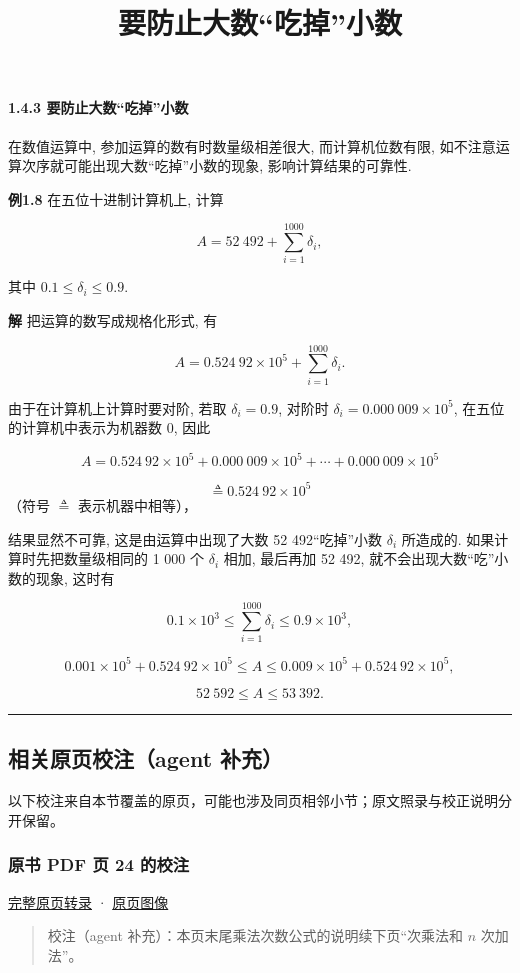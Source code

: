 \documentclass[
  10pt,
  fontset=fandol]{ctexart}
\title{要防止大数``吃掉''小数}
\author{}
\date{}
\begin{document}
\maketitle

\paragraph{1.4.3 要防止大数``吃掉''小数}\label{ux8981ux9632ux6b62ux5927ux6570ux5403ux6389ux5c0fux6570}

在数值运算中, 参加运算的数有时数量级相差很大, 而计算机位数有限, 如不注意运算次序就可能出现大数``吃掉''小数的现象, 影响计算结果的可靠性.

\textbf{例1.8} 在五位十进制计算机上, 计算

\[
A = 52\ 492 + \sum_{i=1}^{1000} \delta_i,
\]

其中 \(0.1 \leqslant \delta_i \leqslant 0.9\).

\textbf{解} 把运算的数写成规格化形式, 有

\[
A = 0.524\ 92 \times 10^5 + \sum_{i=1}^{1000} \delta_i.
\]

由于在计算机上计算时要对阶, 若取 \(\delta_i = 0.9\), 对阶时 \(\delta_i = 0.000\ 009 \times 10^5\), 在五位的计算机中表示为机器数 0, 因此

\[
A = 0.524\ 92 \times 10^5 + 0.000\ 009 \times 10^5 + \cdots + 0.000\ 009 \times 10^5
\]

\[
\triangleq 0.524\ 92 \times 10^5
\] （符号 \(\triangleq\) 表示机器中相等），

结果显然不可靠, 这是由运算中出现了大数 52 492``吃掉''小数 \(\delta_i\) 所造成的. 如果计算时先把数量级相同的 1 000 个 \(\delta_i\) 相加, 最后再加 52 492, 就不会出现大数``吃''小数的现象, 这时有

\[
0.1 \times 10^3 \leqslant \sum_{i=1}^{1000} \delta_i \leqslant 0.9 \times 10^3,
\]

\[
0.001 \times 10^5 + 0.524\ 92 \times 10^5 \leqslant A \leqslant 0.009 \times 10^5 + 0.524\ 92 \times 10^5,
\]

\[
52\ 592 \leqslant A \leqslant 53\ 392.
\]

\begin{center}\rule{0.5\linewidth}{0.5pt}\end{center}

\subsection{相关原页校注（agent 补充）}\label{ux76f8ux5173ux539fux9875ux6821ux6ce8agent-ux8865ux5145}

以下校注来自本节覆盖的原页，可能也涉及同页相邻小节；原文照录与校正说明分开保留。

\subsubsection{原书 PDF 页 24 的校注}\label{ux539fux4e66-pdf-ux9875-24-ux7684ux6821ux6ce8}

\href{../pages/pdf-024.md}{完整原页转录} · \href{../../source-images/pdf-024.jpeg}{原页图像}

\begin{quote}
校注（agent 补充）：本页末尾乘法次数公式的说明续下页``次乘法和 \(n\) 次加法''。
\end{quote}
\end{document}
